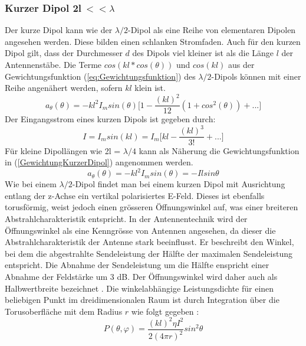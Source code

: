 \newpage
\subsubsection{Kurzer Dipol 2l$ \ <<\lambda$}\label{sec:kurzerDipol}
Der kurze Dipol kann wie der $\lambda /2$-Dipol als eine Reihe von elementaren Dipolen angesehen werden. Diese bilden einen schlanken Stromfaden. Auch für den kurzen Dipol gilt, dass der Durchmesser $d$ des Dipols viel kleiner ist als die Länge $l$ der Antennenstäbe. Die Terme $cos(kl*cos(\theta)) $ und $cos(kl)$ aus der Gewichtungsfunktion (\ref{eq:Gewichtungsfunktion}) des $\lambda/2$-Dipols können mit einer Reihe angenähert werden, sofern $kl$ klein ist.
\begin{equation}
a_{\theta}(\theta)=-kl^{2}I_{m}sin(\theta) \biggl\lbrack 1- \frac{(kl)^{2}}{12}(1+cos^{2}(\theta))+...\biggr\rbrack
\end{equation}
Der Eingangsstrom eines kurzen Dipols ist gegeben durch:
\begin{equation}
I=I_{m}sin(kl)=I_{m}\biggl\lbrack kl - \frac{(kl)^{3}}{3!} +... \biggr\rbrack
\end{equation}
 Für kleine Dipollängen wie 2l = $\lambda/4 $ kann als Näherung die Gewichtungsfunktion in (\ref{GewichtungKurzerDipol}) angenommen werden.
\begin{equation}\label{GewichtungKurzerDipol}
a_{\theta}(\theta)=-kl^{2}I_{m}sin(\theta)=-Ilsin\theta
\end{equation}
Wie bei einem $\lambda/2$-Dipol findet man bei einem kurzen Dipol mit Ausrichtung entlang der z-Achse ein vertikal polarisiertes E-Feld. Dieses ist ebenfalls torusförmig, weist jedoch einen grösseren Öffnungswinkel auf, was einer breiteren Abstrahlcharakteristik entspricht. In der Antennentechnik wird der Öffnungswinkel als eine Kenngrösse von Antennen angesehen, da dieser die Abstrahlcharakteristik der Antenne stark beeinflusst. Er beschreibt den Winkel, bei dem die abgestrahlte Sendeleistung der Hälfte der maximalen Sendeleistung entspricht. Die Abnahme der Sendeleistung um die Hälfte enspricht einer Abnahme der Feldstärke um 3 dB. Der Öffnungswinkel wird daher auch als Halbwertbreite bezeichnet \cite{Oeffnungswinkel}. Die winkelabhängige Leistungsdichte für einen beliebigen Punkt im dreidimensionalen Raum ist durch Integration über die Torusoberfläche mit dem Radius $r$ wie folgt gegeben \cite{elliott1981antenna}:
\begin{equation}
P(\theta,\varphi)=\frac{(kl)^{2}\eta I^{2}}{2(4\pi r)^{2}}sin^{2}\theta
\label{Prad_kurzerDipol}
\end{equation}
